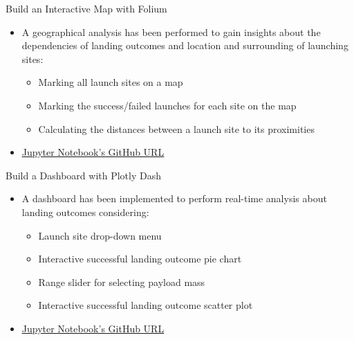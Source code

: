 \begin{frame}{Build an Interactive Map with Folium}
    \begin{itemize}
        \item A geographical analysis has been performed to gain insights about the dependencies of landing outcomes and location and surrounding of launching sites:
        \begin{itemize}
            \item Marking all launch sites on a map
            \item Marking the success/failed launches for each site on the map
            \item Calculating the distances between a launch site to its proximities
        \end{itemize}
        \item \href{https://github.com/eyamrog/ibm_data_science/blob/main/10_Data_Science_Capstone_Interactive_Visual_Analytics_with_Folium.ipynb}{\uline{Jupyter Notebook's GitHub URL}}
    \end{itemize}
\end{frame}

\begin{frame}{Build a Dashboard with Plotly Dash}
    \begin{itemize}
        \item A dashboard has been implemented to perform real-time analysis about landing outcomes considering:
        \begin{itemize}
            \item Launch site drop-down menu
            \item Interactive successful landing outcome pie chart
            \item Range slider for selecting payload mass
            \item Interactive successful landing outcome scatter plot
        \end{itemize}
        \item \href{https://github.com/eyamrog/ibm_data_science/blob/main/spacex_dash_app.ipynb}{\uline{Jupyter Notebook's GitHub URL}}
    \end{itemize}
\end{frame}

